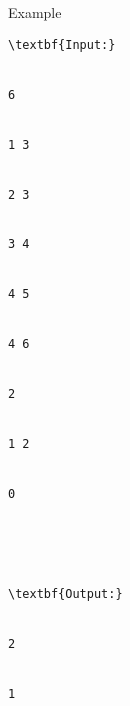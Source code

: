 Example
\begin{verbatim}
\textbf{Input:}


6


1 3


2 3


3 4


4 5


4 6


2


1 2


0





\textbf{Output:}


2


1\end{verbatim}